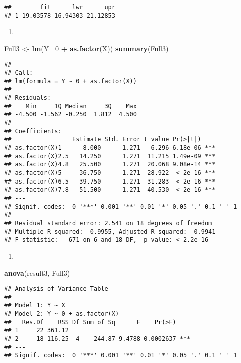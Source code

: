 \documentclass[
]{article}
\newenvironment{Shaded}{\begin{snugshade}}{\end{snugshade}}
\newcommand{\DecValTok}[1]{\textcolor[rgb]{0.00,0.00,0.81}{#1}}
\newcommand{\KeywordTok}[1]{\textcolor[rgb]{0.13,0.29,0.53}{\textbf{#1}}}
\newcommand{\NormalTok}[1]{#1}
\newcommand{\OperatorTok}[1]{\textcolor[rgb]{0.81,0.36,0.00}{\textbf{#1}}}
\newcommand{\StringTok}[1]{\textcolor[rgb]{0.31,0.60,0.02}{#1}}
\begin{document}
\begin{verbatim}
##        fit      lwr      upr
## 1 19.03578 16.94303 21.12853
\end{verbatim}

\begin{enumerate}
\def\labelenumi{(\alph{enumi})}
\setcounter{enumi}{6}
\item
\end{enumerate}

\begin{Shaded}
\begin{Highlighting}[]
\NormalTok{Full3 <-}\StringTok{ }\KeywordTok{lm}\NormalTok{(Y}\OperatorTok{~}\StringTok{ }\DecValTok{0} \OperatorTok{+}\StringTok{ }\KeywordTok{as.factor}\NormalTok{(X))}
\KeywordTok{summary}\NormalTok{(Full3)}
\end{Highlighting}
\end{Shaded}

\begin{verbatim}
## 
## Call:
## lm(formula = Y ~ 0 + as.factor(X))
## 
## Residuals:
##    Min     1Q Median     3Q    Max 
## -4.500 -1.562 -0.250  1.812  4.500 
## 
## Coefficients:
##                 Estimate Std. Error t value Pr(>|t|)    
## as.factor(X)1      8.000      1.271   6.296 6.18e-06 ***
## as.factor(X)2.5   14.250      1.271  11.215 1.49e-09 ***
## as.factor(X)4.8   25.500      1.271  20.068 9.08e-14 ***
## as.factor(X)5     36.750      1.271  28.922  < 2e-16 ***
## as.factor(X)6.5   39.750      1.271  31.283  < 2e-16 ***
## as.factor(X)7.8   51.500      1.271  40.530  < 2e-16 ***
## ---
## Signif. codes:  0 '***' 0.001 '**' 0.01 '*' 0.05 '.' 0.1 ' ' 1
## 
## Residual standard error: 2.541 on 18 degrees of freedom
## Multiple R-squared:  0.9955, Adjusted R-squared:  0.9941 
## F-statistic:   671 on 6 and 18 DF,  p-value: < 2.2e-16
\end{verbatim}

\begin{enumerate}
\def\labelenumi{(\alph{enumi})}
\setcounter{enumi}{7}
\item
\end{enumerate}

\begin{Shaded}
\begin{Highlighting}[]
\KeywordTok{anova}\NormalTok{(result3, Full3)}
\end{Highlighting}
\end{Shaded}

\begin{verbatim}
## Analysis of Variance Table
## 
## Model 1: Y ~ X
## Model 2: Y ~ 0 + as.factor(X)
##   Res.Df    RSS Df Sum of Sq      F    Pr(>F)    
## 1     22 361.12                                  
## 2     18 116.25  4    244.87 9.4788 0.0002637 ***
## ---
## Signif. codes:  0 '***' 0.001 '**' 0.01 '*' 0.05 '.' 0.1 ' ' 1
\end{verbatim}
\end{document}

